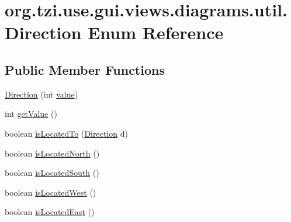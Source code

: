 \hypertarget{enumorg_1_1tzi_1_1use_1_1gui_1_1views_1_1diagrams_1_1util_1_1_direction}{\section{org.\-tzi.\-use.\-gui.\-views.\-diagrams.\-util.\-Direction Enum Reference}
\label{enumorg_1_1tzi_1_1use_1_1gui_1_1views_1_1diagrams_1_1util_1_1_direction}
}
\subsection*{Public Member Functions}
\begin{DoxyCompactItemize}
\item 
\hyperlink{enumorg_1_1tzi_1_1use_1_1gui_1_1views_1_1diagrams_1_1util_1_1_direction_a2d60e3194517f97761a82dd076f64e93}{Direction} (int \hyperlink{enumorg_1_1tzi_1_1use_1_1gui_1_1views_1_1diagrams_1_1util_1_1_direction_a768d8dfd1377fb7ca62f8b910f7446f5}{value})
\item 
int \hyperlink{enumorg_1_1tzi_1_1use_1_1gui_1_1views_1_1diagrams_1_1util_1_1_direction_a23a2b1cf9be48ee50048cc03da602357}{get\-Value} ()
\item 
boolean \hyperlink{enumorg_1_1tzi_1_1use_1_1gui_1_1views_1_1diagrams_1_1util_1_1_direction_a502de72d072cba15870cfb0723a677b0}{is\-Located\-To} (\hyperlink{enumorg_1_1tzi_1_1use_1_1gui_1_1views_1_1diagrams_1_1util_1_1_direction}{Direction} d)
\item 
boolean \hyperlink{enumorg_1_1tzi_1_1use_1_1gui_1_1views_1_1diagrams_1_1util_1_1_direction_a0f53971fd8817d1ee487308d39d98b0c}{is\-Located\-North} ()
\item 
boolean \hyperlink{enumorg_1_1tzi_1_1use_1_1gui_1_1views_1_1diagrams_1_1util_1_1_direction_a726a893d5ff49e6d02e8928b38d4185a}{is\-Located\-South} ()
\item 
boolean \hyperlink{enumorg_1_1tzi_1_1use_1_1gui_1_1views_1_1diagrams_1_1util_1_1_direction_aa668b0bcea2abb75ad95da55f37a56ae}{is\-Located\-West} ()
\item 
boolean \hyperlink{enumorg_1_1tzi_1_1use_1_1gui_1_1views_1_1diagrams_1_1util_1_1_direction_a47b94da5baba81be5eef25321d736e5e}{is\-Located\-East} ()
\end{DoxyCompactItemize}
